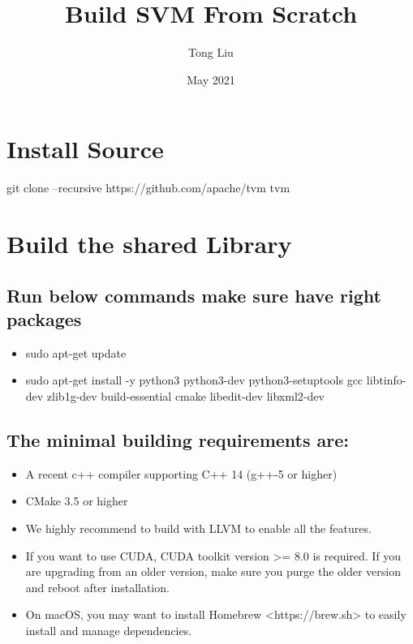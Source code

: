 \documentclass{article}
\title{Build SVM From Scratch}
\author{Tong Liu }
\date{May 2021}
\begin{document}
\maketitle

\section{Install Source}
git clone --recursive https://github.com/apache/tvm tvm\\

\section{Build the shared Library}
\subsection{Run below commands make sure  have right packages}
\begin{itemize}
    \item sudo apt-get update\\
    \item sudo apt-get install -y python3 python3-dev python3-setuptools gcc libtinfo-dev zlib1g-dev build-essential cmake libedit-dev libxml2-dev\\
\end{itemize}

\subsection{The minimal building requirements are:}
\begin{itemize}
    \item A recent c++ compiler supporting C++ 14 (g++-5 or higher)
    \item CMake 3.5 or higher
    \item We highly recommend to build with LLVM to enable all the features.
    \item If you want to use CUDA, CUDA toolkit version >= 8.0 is required. If you are upgrading from an older version, make sure you purge the older version and reboot after installation.
    \item On macOS, you may want to install Homebrew <https://brew.sh> to easily install and manage dependencies.
\end{itemize}
\end{document}
